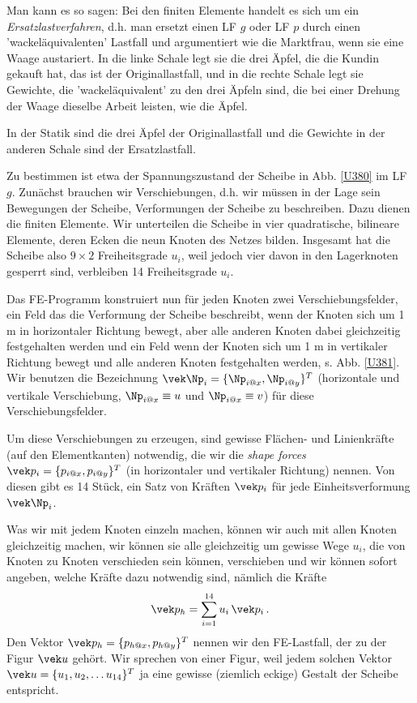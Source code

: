 {Man kann es so sagen: Bei den finiten Elemente handelt es sich um ein {\em Ersatzlastverfahren\/}, d.h. man ersetzt einen LF $g$ oder LF $p$ durch einen 'wackel\-\"{a}quivalenten' Lastfall und argumentiert wie die Marktfrau, wenn sie eine Waage austariert. In die linke Schale legt sie die drei \"{A}pfel, die die Kundin gekauft hat, das ist der Originallastfall, und in die rechte Schale legt sie Gewichte, die 'wackel\"{a}quivalent' zu den drei \"{A}pfeln sind, die bei einer Drehung der Waage dieselbe Arbeit leisten, wie die \"{A}pfel.

In der Statik sind die drei \"{A}pfel der Originallastfall und die Gewichte in der anderen Schale sind der Ersatzlastfall.

Zu bestimmen ist etwa der Spannungszustand der Scheibe in Abb. \ref{U380} im LF $g$. Zun\"{a}chst brauchen wir Verschiebungen, d.h. wir m\"{u}ssen in der Lage sein Bewegungen der Scheibe, Verformungen der Scheibe zu beschreiben. Dazu dienen die finiten Elemente. Wir unterteilen die Scheibe in vier quadratische, bilineare Elemente, deren Ecken die neun Knoten des Netzes bilden. Insgesamt hat die Scheibe also $9 \times 2$ Freiheitsgrade $u_i$, weil jedoch vier davon in den Lagerknoten gesperrt sind, verbleiben 14 Freiheitsgrade $u_i$.

Das FE-Programm konstruiert nun f\"{u}r jeden Knoten zwei Verschiebungsfelder, ein Feld das die Verformung der Scheibe beschreibt, wenn der Knoten sich um 1 m in horizontaler Richtung bewegt, aber alle anderen Knoten dabei gleichzeitig festgehalten werden und ein Feld wenn der Knoten sich um 1 m in vertikaler Richtung bewegt und alle anderen Knoten festgehalten werden, s. Abb. \ref{U381}. Wir benutzen die Bezeichnung $\vek \Np_i = \{\Np_{i @x}, \Np_{i @y}\}^T$ (horizontale und vertikale Verschiebung, $\Np_{i @x} \equiv u$ und $\Np_{i @x} \equiv v$) f\"{u}r diese Verschiebungsfelder.

Um diese Verschiebungen zu erzeugen, sind gewisse Fl\"{a}chen-  und Linienkr\"{a}fte (auf den Elementkanten) notwendig, die wir die {\em shape forces\/} $\vek p_i = \{p_{i @x}, p_{i @y}\}^T$ (in horizontaler und vertikaler Richtung) nennen. Von diesen gibt es 14 St\"{u}ck, ein Satz von Kr\"{a}ften $\vek p_i$ f\"{u}r jede Einheitsverformung $\vek \Np_i$.

Was wir mit jedem Knoten einzeln machen, k\"{o}nnen wir auch mit allen Knoten gleichzeitig machen, wir k\"{o}nnen sie alle gleichzeitig um gewisse Wege $u_i$, die von Knoten zu Knoten verschieden sein k\"{o}nnen, verschieben und wir k\"{o}nnen sofort angeben, welche Kr\"{a}fte dazu notwendig sind, n\"{a}mlich die Kr\"{a}fte
\begin{align}\label{Eq99}
\vek p_h = \sum_{i = 1}^{14} u_i\,\vek p_i\,.
\end{align}
Den Vektor $\vek p_h = \{p_{h @x}, p_{h @y}\}^T$ nennen wir den FE-Lastfall, der zu der Figur $\vek u$ geh\"{o}rt. Wir sprechen von einer Figur, weil jedem solchen Vektor $\vek u = \{u_1, u_2, \ldots u_{14}\}^T$ ja eine gewisse (ziemlich eckige) Gestalt der Scheibe entspricht.

}
